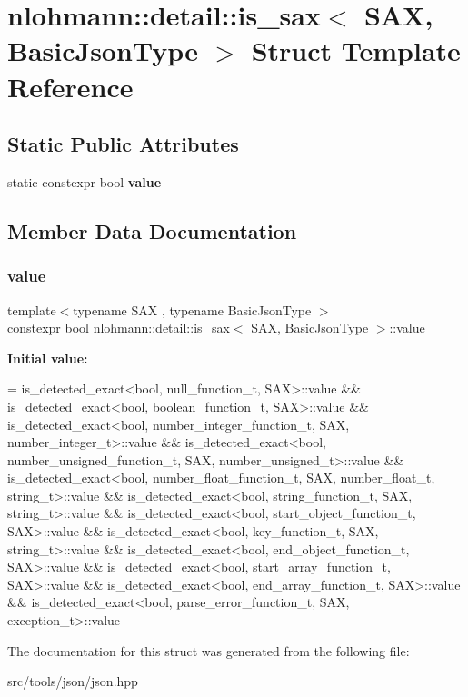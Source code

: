 \hypertarget{structnlohmann_1_1detail_1_1is__sax}{}\section{nlohmann\+:\+:detail\+:\+:is\+\_\+sax$<$ S\+AX, Basic\+Json\+Type $>$ Struct Template Reference}
\label{structnlohmann_1_1detail_1_1is__sax}
\subsection*{Static Public Attributes}
\begin{DoxyCompactItemize}
\item 
static constexpr bool {\bfseries value}
\end{DoxyCompactItemize}


\subsection{Member Data Documentation}
\mbox{\label{structnlohmann_1_1detail_1_1is__sax_a8ab7e51087000e948b4a2492257484dc}} 
\subsubsection{\texorpdfstring{value}{value}}
{\footnotesize\ttfamily template$<$typename S\+AX , typename Basic\+Json\+Type $>$ \\
constexpr bool \hyperlink{structnlohmann_1_1detail_1_1is__sax}{nlohmann\+::detail\+::is\+\_\+sax}$<$ S\+AX, Basic\+Json\+Type $>$\+::value\hspace{0.3cm}{\ttfamily [static]}}

{\bfseries Initial value\+:}
\begin{DoxyCode}
=
        is\_detected\_exact<bool, null\_function\_t, SAX>::value &&
        is\_detected\_exact<bool, boolean\_function\_t, SAX>::value &&
        is\_detected\_exact<bool, number\_integer\_function\_t, SAX,
        number\_integer\_t>::value &&
        is\_detected\_exact<bool, number\_unsigned\_function\_t, SAX,
        number\_unsigned\_t>::value &&
        is\_detected\_exact<bool, number\_float\_function\_t, SAX, number\_float\_t,
        string\_t>::value &&
        is\_detected\_exact<bool, string\_function\_t, SAX, string\_t>::value &&
        is\_detected\_exact<bool, start\_object\_function\_t, SAX>::value &&
        is\_detected\_exact<bool, key\_function\_t, SAX, string\_t>::value &&
        is\_detected\_exact<bool, end\_object\_function\_t, SAX>::value &&
        is\_detected\_exact<bool, start\_array\_function\_t, SAX>::value &&
        is\_detected\_exact<bool, end\_array\_function\_t, SAX>::value &&
        is\_detected\_exact<bool, parse\_error\_function\_t, SAX, exception\_t>::value
\end{DoxyCode}


The documentation for this struct was generated from the following file\+:\begin{DoxyCompactItemize}
\item 
src/tools/json/json.\+hpp\end{DoxyCompactItemize}
